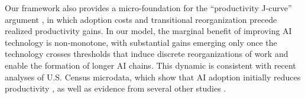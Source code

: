 Our framework also provides a micro-foundation for the ``productivity J-curve'' argument \citep{brynjolfsson2021productivity}, in which adoption costs and transitional reorganization precede realized productivity gains.
In our model, the marginal benefit of improving AI technology is non-monotone, with substantial gains emerging only once the technology crosses thresholds that induce discrete reorganizations of work and enable the formation of longer AI chains.
This dynamic is consistent with recent analyses of U.S. Census microdata, which show that AI adoption initially reduces productivity \citep{mcelheran2025rise}, as well as evidence from several other studies \citep{furman2019ai, tambe2012productivity, bonney2024tracking, mcelheran2024adoption}.
